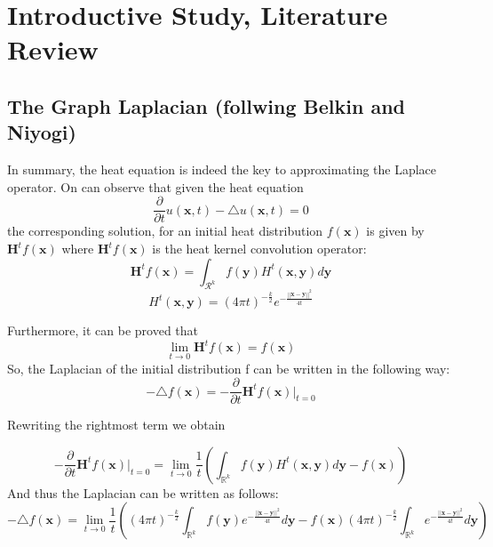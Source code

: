 

\setcounter{page}{1}
\graphicspath{{Figs/LiteratureReview}}



\section {Introductive Study, Literature Review} 

\subsection{The Graph Laplacian (follwing Belkin and Niyogi)}
In summary, the heat equation is indeed the key to approximating the Laplace operator. On can observe that given the heat equation 
\begin{equation}
\frac{\partial}{\partial t}u(\mathbf x, t)-\triangle u(\mathbf x, t) = 0
\end{equation}
the corresponding solution, for an initial heat distribution $f(\mathbf x)$ is given by $\mathbf{H}^t f(\mathbf x) $
where $\mathbf{H}^t f(\mathbf x)$ is the heat kernel convolution operator:
$$\mathbf{H}^t f(\mathbf x) = \int_{\mathcal R^k}f(\mathbf y)H^t(\mathbf x, \mathbf y) d\mathbf y$$
$$H^t(\mathbf x, \mathbf y)  = (4\pi t)^{-\frac{k}{2}}e^{-\frac{||\mathbf x - \mathbf y||^2}{4t}}$$

Furthermore, it can be proved that 
$$\lim_{t\rightarrow 0} \mathbf{H}^t f(\mathbf x) = f(\mathbf x) $$
So, the Laplacian of the initial distribution f can be written in the following way:
\begin{equation}
-\triangle f(\mathbf x) = -\frac{\partial}{\partial t}\mathbf{H}^t f(\mathbf x) |_{t=0}
\end{equation}

Rewriting the rightmost term we obtain

$$-\frac{\partial}{\partial t}\mathbf{H}^t f(\mathbf x) |_{t=0}  = \lim_{t\rightarrow 0} \frac{1}{t}\left( \int_{\mathbb R^k}f(\mathbf y)H^t(\mathbf x, \mathbf y)d\mathbf y - f(\mathbf x)\right)$$
And thus the Laplacian can be written as follows:
$$-\triangle f(\mathbf x) = \lim_{t\rightarrow 0} \frac{1}{t}\left((4\pi t)^{-\frac{k}{2}} \int_{\mathbb R^k}f(\mathbf y)e^{-\frac{||\mathbf x - \mathbf y||^2}{4t}}d\mathbf y - f(\mathbf x)(4\pi t)^{-\frac{k}{2}} \int_{\mathbb R^k} e^{-\frac{||\mathbf x - \mathbf y||^2}{4t}}d\mathbf y \right)$$

